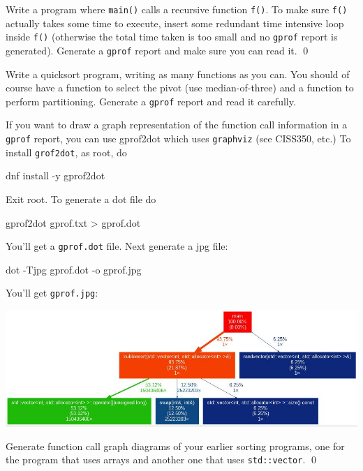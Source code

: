 \begin{ex}
  Write a program where \verb!main()! calls a recursive function
  \verb!f()!.
  To make sure \verb!f()! actually takes
  some time to execute, insert some redundant time intensive
  loop inside \verb!f()!
  (otherwise the total time taken is too small and no
  \verb!gprof! report is generated).
  Generate a \verb!gprof! report and make sure you can read it.
  \qed
\end{ex}

\begin{ex}
  Write a quicksort program, writing as many functions as you can.
  You should of course have a function to select the pivot (use
  median-of-three) and a function to perform partitioning.
  Generate a \verb!gprof! report and read it carefully.
\end{ex}

If you want to draw a graph representation of the function call information
in a \verb!gprof! report,
you can use gprof2dot which uses \verb!graphviz! (see CISS350, etc.)
To install \verb!grof2dot!, as root, do
\begin{console}[fontsize=\footnotesize]
dnf install -y gprof2dot
\end{console}
Exit root.
To generate a dot file do
\begin{console}[fontsize=\footnotesize]
gprof2dot gprof.txt > gprof.dot
\end{console}
You'll get a \verb!gprof.dot! file.
Next generate a jpg file:
\begin{console}[fontsize=\footnotesize]
dot -Tjpg gprof.dot -o gprof.jpg
\end{console}
You'll get \verb!gprof.jpg!:
\begin{center}
\includegraphics[width=\textwidth]{../gprof/gprof.jpg}
\end{center}

\begin{ex}
  Generate function call graph diagrams of your earlier sorting
  programs, 
  one for the program that uses arrays and another one that
  uses \verb!std::vector!.
  \qed
\end{ex}
